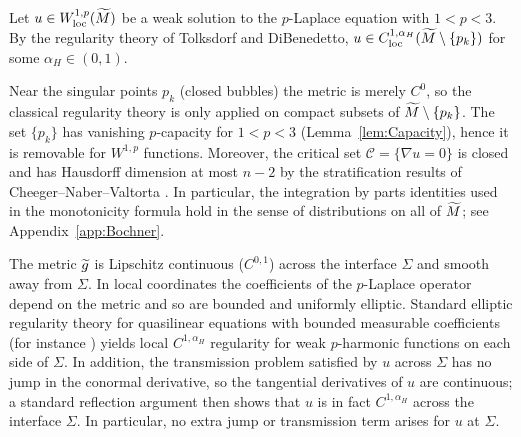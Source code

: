 \begin{theorem}\label{thm:Reg_p}
Let $u \in W^{1,p}_{\text{loc}}(\widetilde{M})$ be a weak solution to the $p$-Laplace equation with $1 < p < 3$. By the regularity theory of Tolksdorf and DiBenedetto, $u \in C^{1,\alpha_H}_{\text{loc}}(\widetilde{M} \setminus \{p_k\})$ for some $\alpha_H \in (0,1)$.

Near the singular points $p_k$ (closed bubbles) the metric is merely $C^0$, so the classical regularity theory is only applied on compact subsets of $\widetilde{M} \setminus \{p_k\}$. The set $\{p_k\}$ has vanishing $p$-capacity for $1<p<3$ (Lemma~\ref{lem:Capacity}), hence it is removable for $W^{1,p}$ functions. Moreover, the critical set $\mathcal{C} = \{ \nabla u = 0 \}$ is closed and has Hausdorff dimension at most $n-2$ by the stratification results of Cheeger--Naber--Valtorta \cite{cheegernabervaltorta2015}. In particular, the integration by parts identities used in the monotonicity formula hold in the sense of distributions on all of $\widetilde{M}$; see Appendix~\ref{app:Bochner}.
\end{theorem}

\begin{remark}
The metric $\widetilde{g}$ is Lipschitz continuous ($C^{0,1}$) across the interface $\Sigma$ and smooth away from $\Sigma$. In local coordinates the coefficients of the $p$-Laplace operator depend on the metric and so are bounded and uniformly elliptic. Standard elliptic regularity theory for quasilinear equations with bounded measurable coefficients (for instance \cite{tolksdorf1984, lieberman1988}) yields local $C^{1,\alpha_H}$ regularity for weak $p$-harmonic functions on each side of $\Sigma$. In addition, the transmission problem satisfied by $u$ across $\Sigma$ has no jump in the conormal derivative, so the tangential derivatives of $u$ are continuous; a standard reflection argument then shows that $u$ is in fact $C^{1,\alpha_H}$ across the interface $\Sigma$. In particular, no extra jump or transmission term arises for $u$ at $\Sigma$.
\end{remark}


